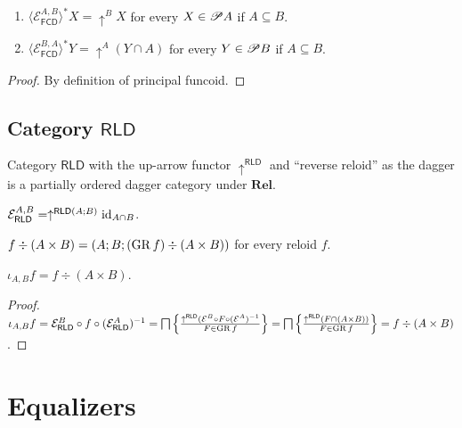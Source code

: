 \begin{prop}
  ~
  \begin{enumerate}
    \item $\langle \mathcal{E}_{\mathsf{FCD}}^{A,B} \rangle^{\ast} X
    = \uparrow^B X$ for every $X \in \mathscr{P} A$ if $A \subseteq B$.
    
    \item $\langle \mathcal{E}_{\mathsf{FCD}}^{B,A} \rangle^{\ast}
    Y = \uparrow^A (Y \cap A)$ for every $Y \in \mathscr{P} B$ if $A \subseteq
    B$.
  \end{enumerate}
\end{prop}

\begin{proof}
  By definition of principal funcoid.
\end{proof}

\subsection{\texorpdfstring{Category $\mathsf{RLD}$}{Category RLD}}

Category $\mathsf{RLD}$ with the up-arrow functor
$\uparrow^{\mathsf{RLD}}$ and ``reverse reloid'' as the dagger is a
partially ordered dagger category under $\mathbf{Rel}$.

\begin{obvious}
$\mathcal{E}_{\mathsf{RLD}}^{A,B} = \uparrow^{\mathsf{RLD} (A ;
B)} \operatorname{id}_{A \cap B}$.
\end{obvious}

\begin{defn}
  $f \div (A \times B) = (A ; B ; (\operatorname{GR} f) \div (A \times B))$ for every
  reloid $f$.
\end{defn}

\begin{prop}
  $\iota_{A, B} f = f \div (A \times B)$.
\end{prop}

\begin{proof}
  $\iota_{A, B} f = \mathcal{E}_{\mathsf{RLD}}^{B}
\circ f \circ (\mathcal{E}_{\mathsf{RLD}}^{A})^{-1} =
\bigsqcap \left\{ \frac{ \uparrow^{\mathsf{RLD}} (\mathcal{E}^{B} \circ F \circ (\mathcal{E}^{A})^{-1}
}{ F \in \operatorname{GR} f }\right\} = \bigsqcap \left\{ \frac{
\uparrow^{\mathsf{RLD}} (F \cap (A \times B))}{F \in \operatorname{GR} f }\right\} = f \div (A \times B)$.

\end{proof}

\section{Equalizers}

